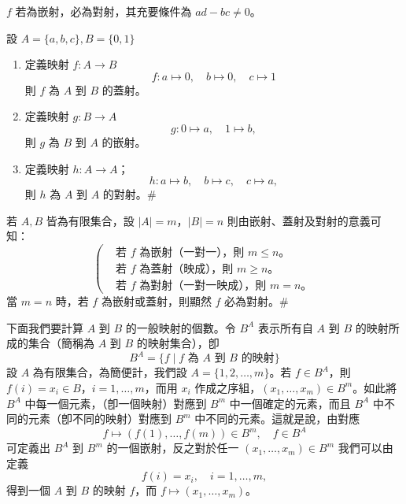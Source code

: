 $f$ 若為嵌射，必為對射，其充要條件為 $ad - bc \ne 0$。

\medskip
\begin{example}\label{ex:b5-2-4}
設 $A=\{a, b, c\}, B=\{0, 1\}$
\begin{enumerate}[label=(\roman*), topsep=2pt, itemsep=4pt]
  \item 定義映射 $f : A \longrightarrow B$
  \[
  f : a \longmapsto 0,\quad b \longmapsto 0,\quad c \longmapsto 1
  \]
  則 $f$ 為 $A$ 到 $B$ 的蓋射。
  \item 定義映射 $g : B \longrightarrow A$
  \[
  g : 0 \longmapsto a,\quad 1 \longmapsto b,
  \]
  則 $g$ 為 $B$ 到 $A$ 的嵌射。
  \item 定義映射 $h : A \longrightarrow A$；
  \[
  h : a \longmapsto b,\quad b \longmapsto c,\quad c \longmapsto a,
  \]
  則 $h$ 為 $A$ 到 $A$ 的對射。\hfill $\#$
\end{enumerate}
\end{example}

\medskip
\begin{example}\label{ex:b5-2-5}
若 $A, B$ 皆為有限集合，設 $|A| = m$，$|B| = n$ 則由嵌射、蓋射及對射的意義可知：
\[
\left(
\begin{aligned}
&\text{若 } f \text{ 為嵌射（一對一），則 } m \le n\text{。} \\
&\text{若 } f \text{ 為蓋射（映成），則 } m \ge n\text{。} \\
&\text{若 } f \text{ 為對射（一對一映成），則 } m = n\text{。}
\end{aligned}
\right.
\]
當 $m = n$ 時，若 $f$ 為嵌射或蓋射，則顯然 $f$ 必為對射。\hfill $\#$
\end{example}

\medskip
下面我們要計算 $A$ 到 $B$ 的一般映射的個數。令 $B^A$ 表示所有自 $A$ 到 $B$ 的映射所成的集合（簡稱為 $A$ 到 $B$ 的映射集合），卽
\[
B^A = \{f \mid f \text{ 為 } A \text{ 到 } B \text{ 的映射}\}
\]
設 $A$ 為有限集合，為簡便計，我們設 $A = \{1, 2, \ldots, m\}$。若 $f \in B^A$，則 $f(i) = x_i \in B$，$i = 1, \ldots, m$，而用 $x_i$ 作成之序組，$(x_1, \ldots, x_m) \in B^m$。如此將 $B^A$ 中每一個元素，（卽一個映射）對應到 $B^m$ 中一個確定的元素，而且 $B^A$ 中不同的元素（卽不同的映射）對應到 $B^m$ 中不同的元素。這就是說，由對應
\[
f \longmapsto (f(1), \ldots, f(m)) \in B^m,\quad f \in B^A
\]
可定義出 $B^A$ 到 $B^m$ 的一個嵌射，反之對於任一 $(x_1, \ldots, x_m) \in B^m$ 我們可以由定義
\[
f(i) = x_i,\quad i = 1, \ldots, m,
\]
得到一個 $A$ 到 $B$ 的映射 $f$，而 $f \longmapsto (x_1, \ldots, x_m)$。

